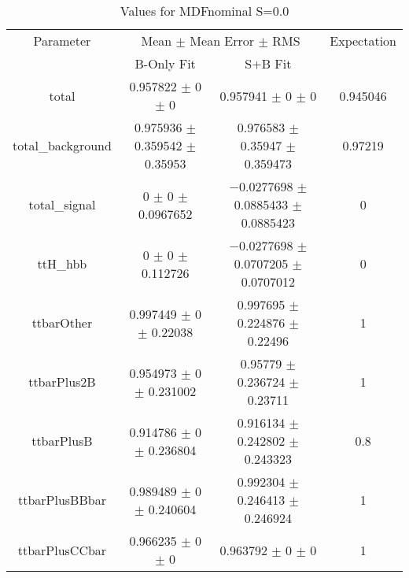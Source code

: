 \begin{table}
\centering
\caption{Values for MDFnominal S=0.0}
\begin{tabular}{cccc}
\toprule
Parameter & \multicolumn{2}{c}{Mean $\pm$ Mean Error $\pm$ RMS} & Expectation\\
 & B-Only Fit & S+B Fit & \\
\midrule
total & \num{0.957822} $\pm$ \num{0} $\pm$ \num{0} & \num{0.957941} $\pm$ \num{0} $\pm$ \num{0} & \num{0.945046}\\
total\_background & \num{0.975936} $\pm$ \num{0.359542} $\pm$ \num{0.35953} & \num{0.976583} $\pm$ \num{0.35947} $\pm$ \num{0.359473} & \num{0.97219}\\
total\_signal & \num{0} $\pm$ \num{0} $\pm$ \num{0.0967652} & \num{-0.0277698} $\pm$ \num{0.0885433} $\pm$ \num{0.0885423} & \num{0}\\
ttH\_hbb & \num{0} $\pm$ \num{0} $\pm$ \num{0.112726} & \num{-0.0277698} $\pm$ \num{0.0707205} $\pm$ \num{0.0707012} & \num{0}\\
ttbarOther & \num{0.997449} $\pm$ \num{0} $\pm$ \num{0.22038} & \num{0.997695} $\pm$ \num{0.224876} $\pm$ \num{0.22496} & \num{1}\\
ttbarPlus2B & \num{0.954973} $\pm$ \num{0} $\pm$ \num{0.231002} & \num{0.95779} $\pm$ \num{0.236724} $\pm$ \num{0.23711} & \num{1}\\
ttbarPlusB & \num{0.914786} $\pm$ \num{0} $\pm$ \num{0.236804} & \num{0.916134} $\pm$ \num{0.242802} $\pm$ \num{0.243323} & \num{0.8}\\
ttbarPlusBBbar & \num{0.989489} $\pm$ \num{0} $\pm$ \num{0.240604} & \num{0.992304} $\pm$ \num{0.246413} $\pm$ \num{0.246924} & \num{1}\\
ttbarPlusCCbar & \num{0.966235} $\pm$ \num{0} $\pm$ \num{0} & \num{0.963792} $\pm$ \num{0} $\pm$ \num{0} & \num{1}\\
\bottomrule
\end{tabular}
\end{table}